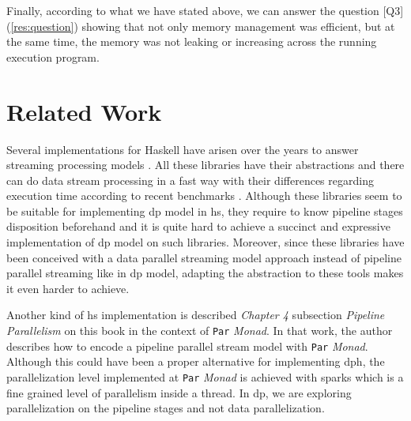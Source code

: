 \documentclass[preprint]{elsarticle}
\begin{document}
Finally, according to what we have stated above, we can answer the question [Q3] (\autoref{res:question}) showing that not only memory management was efficient, but at the same time, the memory was not leaking or increasing across the running execution program.

\section{Related Work}
Several implementations for Haskell have arisen over the years to answer streaming processing models \cite{conduit, pipes, streamly}. All these libraries have their abstractions and there can do data stream processing in a fast way with their differences regarding execution time according to recent benchmarks \cite{benchstreamhs}. Although these libraries seem to be suitable for implementing \acrshort{dp} model in \acrshort{hs}, they require to know pipeline stages disposition beforehand and it is quite hard to achieve a succinct and expressive implementation of \acrshort{dp} model on such libraries. Moreover, since these libraries have been conceived with a data parallel streaming model approach instead of pipeline parallel streaming like in \acrshort{dp} model, adapting the abstraction to these tools makes it even harder to achieve.

Another kind of \acrshort{hs} implementation is described \emph{Chapter 4} subsection \emph{Pipeline Parallelism} on this book \cite{parallelbook} in the context of \texttt{Par} \textit{Monad}. In that work, the author describes how to encode a pipeline parallel stream model with \texttt{Par} \textit{Monad}. Although this could have been a proper alternative for implementing \acrshort{dph}, the parallelization level implemented at \texttt{Par} \textit{Monad} is achieved with sparks \cite{sparks} which is a fine grained level of parallelism inside a thread. In \acrshort{dp}, we are exploring parallelization on the pipeline stages and not data parallelization. 

\end{document}
